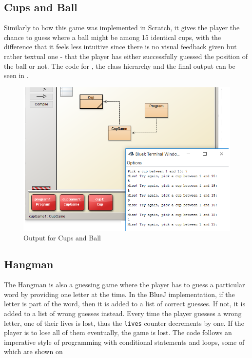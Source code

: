 \subsection{Cups and Ball}
Similarly to how this game was implemented in Scratch, it gives the player the chance to guess where a ball might be among 15 identical cups, with the difference that it feels less intuitive since there is no visual feedback given but rather textual one - that the player has either successfully guessed the position of the ball or not. The code for , the class hierarchy and the final output can be seen in .

\begin{figure}[!h]
  \centering
      \includegraphics[scale=0.7]{./pics/bluej_ballcup_code}
      \caption{Output for Cups and Ball}
      \label{fig:bluej_ballcup_code} 
\end{figure}

\subsection{Hangman}
The Hangman is also a guessing game where the player has to guess a particular word by providing one letter at the time. In the BlueJ implementation, if the letter is part of the word, then it is added to a list of correct guesses. If not, it is added to a list of wrong guesses instead. Every time the player guesses a wrong letter, one of their lives is lost, thus the \lstinline!lives! counter decrements by one. If the player is to lose all of them eventually, the game is lost. The code follows an imperative style of programming with conditional statements and loops, some of which are shown on  

